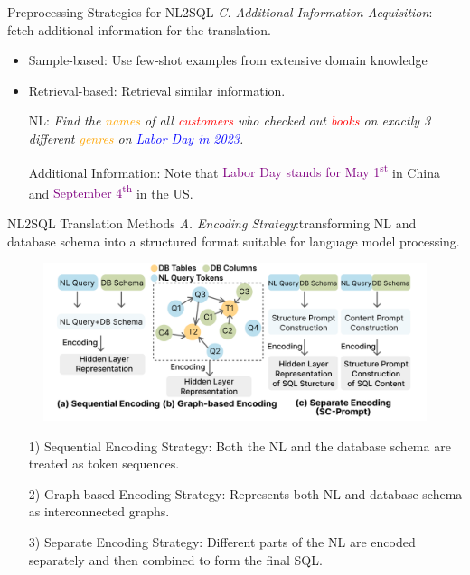 \documentclass[aspectratio=169,xcolor=dvipsnames]{beamer}
\begin{document}
\begin{frame}{Preprocessing Strategies for NL2SQL}
    \textit{C. Additional Information Acquisition}: fetch additional information for the translation.
    \begin{itemize}
        \item Sample-based: Use few-shot examples from extensive domain knowledge
        
        \item Retrieval-based: Retrieval similar information.
        \begin{example}
            NL: \textit{Find the \textcolor{orange}{names} of all \textcolor{red}{customers} who checked out \textcolor{red}{books} on exactly 3 different \textcolor{orange}{genres} on \textcolor{blue}{Labor Day in 2023}.}

            Additional Information: Note that \textcolor{purple}{Labor Day stands for May 1\textsuperscript{st}} in China and \textcolor{purple}{September 4\textsuperscript{th}} in the US.
        \end{example}
    \end{itemize}
\end{frame}

\begin{frame}{NL2SQL Translation Methods}
    \textit{A. Encoding Strategy}:transforming NL and database schema into a structured format suitable for language model processing.
    \begin{figure}
        \includegraphics[width=.55\linewidth]{assets/encoding.png}
    \end{figure}
    \begin{itemize}
        \item[1)]Sequential Encoding Strategy: Both the NL and the database schema are treated as token sequences.
        \item[2)]Graph-based Encoding Strategy: Represents both NL and database schema as interconnected graphs.
        \item[3)]Separate Encoding Strategy: Different parts of the NL are encoded separately and then combined to form the final SQL.
    \end{itemize}
\end{frame}
\end{document}
